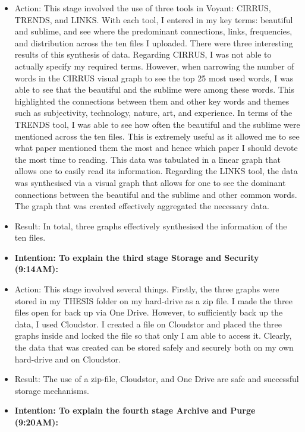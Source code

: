 \documentclass[a4paper,12pt]{article}
\begin{document}
\begin{itemize}
\item Action: This stage involved the use of three tools in Voyant: CIRRUS, TRENDS, and LINKS. With each tool, I entered in my key terms: beautiful and sublime, and see where the predominant connections, links, frequencies, and distribution across the ten files I uploaded. There were three interesting results of this synthesis of data. Regarding CIRRUS, I was not able to actually specify my required terms. However, when narrowing the number of words in the CIRRUS visual graph to see the top 25 most used words, I was able to see that the beautiful and the sublime were among these words. This highlighted the connections between them and other key words and themes such as subjectivity, technology, nature, art, and experience.  In terms of the TRENDS tool, I was able to see how often the beautiful and the sublime were mentioned across the ten files. This is extremely useful as it allowed me to see what paper mentioned them the most and hence which paper I should devote the most time to reading. This data was tabulated in a linear graph that allows one to easily read its information. Regarding the LINKS tool, the data was synthesised via a visual graph that allows for one to see the dominant connections between the beautiful and the sublime and other common words. The graph that was created effectively aggregated the necessary data. 


\item Result: In total, three graphs effectively synthesised the information of the ten files. 


\item \textbf{Intention: To explain the third stage Storage and Security (9:14AM):}


\item Action: This stage involved several things. Firstly, the three graphs were stored in my THESIS folder on my hard-drive as a zip file. I made the three files open for back up via One Drive. However, to sufficiently back up the data, I used Cloudstor. I created a file on Cloudstor and placed the three graphs inside and locked the file so that only I am able to access it. Clearly, the data that was created can be stored safely and securely both on my own hard-drive and on Cloudstor. 


\item Result: The use of a zip-file, Cloudstor, and One Drive are safe and successful storage mechanisms. 


\item \textbf{Intention: To explain the fourth stage Archive and Purge (9:20AM):}



\end{itemize}
\end{document}
